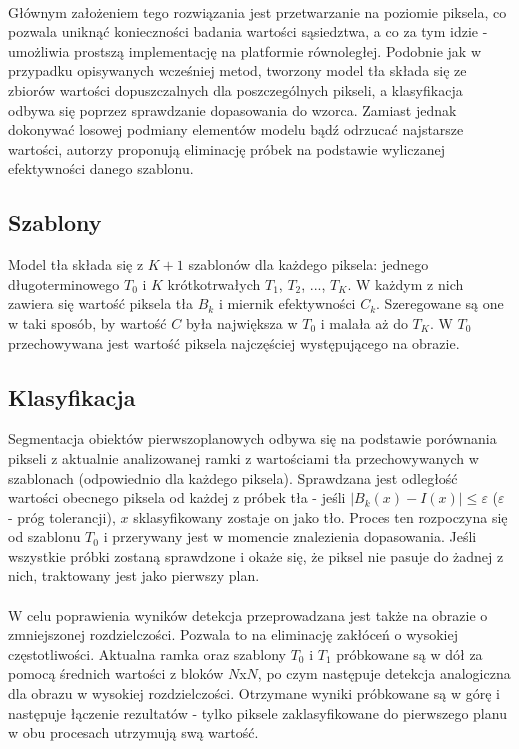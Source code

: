 \paragraph{}
Głównym założeniem tego rozwiązania jest przetwarzanie na poziomie piksela, co pozwala uniknąć konieczności badania wartości sąsiedztwa, a co za tym idzie - umożliwia prostszą implementację na platformie równoległej. Podobnie jak w przypadku opisywanych wcześniej metod, tworzony model tła składa się ze zbiorów wartości dopuszczalnych dla poszczególnych pikseli, a klasyfikacja odbywa się poprzez sprawdzanie dopasowania do wzorca. Zamiast jednak dokonywać losowej podmiany elementów modelu bądź odrzucać najstarsze wartości, autorzy proponują eliminację próbek na podstawie wyliczanej efektywności danego szablonu.
\subsection{Szablony}
Model tła składa się z $K+1$ szablonów dla każdego piksela: jednego długoterminowego $T_{0}$ i $K$ krótkotrwałych $T_{1}$, $T_{2}$, ..., $T_{K}$. W każdym z nich zawiera się wartość piksela tła $B_{k}$ i miernik efektywności $C_{k}$. Szeregowane są one w taki sposób, by wartość $C$ była największa w $T_{0}$ i malała aż do $T_{K}$. W $T_{0}$ przechowywana jest wartość piksela najczęściej występującego na obrazie.
\subsection{Klasyfikacja}
Segmentacja obiektów pierwszoplanowych odbywa się na podstawie porównania pikseli z aktualnie analizowanej ramki z wartościami tła przechowywanych w szablonach (odpowiednio dla każdego piksela).  Sprawdzana jest odległość wartości obecnego piksela od każdej z próbek tła - jeśli $|B_{k}(x)-I(x)|\leq \varepsilon$ ($\varepsilon$ - próg tolerancji), $x$ sklasyfikowany zostaje on jako tło. Proces ten rozpoczyna się od szablonu $T_{0}$ i przerywany jest w momencie znalezienia dopasowania. Jeśli wszystkie próbki zostaną sprawdzone i okaże się, że piksel nie pasuje do żadnej z nich, traktowany jest jako pierwszy plan.
\paragraph{}
W celu poprawienia wyników detekcja przeprowadzana jest także na obrazie o zmniejszonej rozdzielczości. Pozwala to na eliminację zakłóceń o wysokiej częstotliwości. Aktualna ramka oraz szablony $T_{0}$ i $T_{1}$ próbkowane są w dół za pomocą średnich wartości z bloków $N$x$N$, po czym następuje detekcja analogiczna dla obrazu w wysokiej rozdzielczości. Otrzymane wyniki próbkowane są w górę i następuje łączenie rezultatów - tylko piksele zaklasyfikowane do pierwszego planu w obu procesach utrzymują swą wartość.
